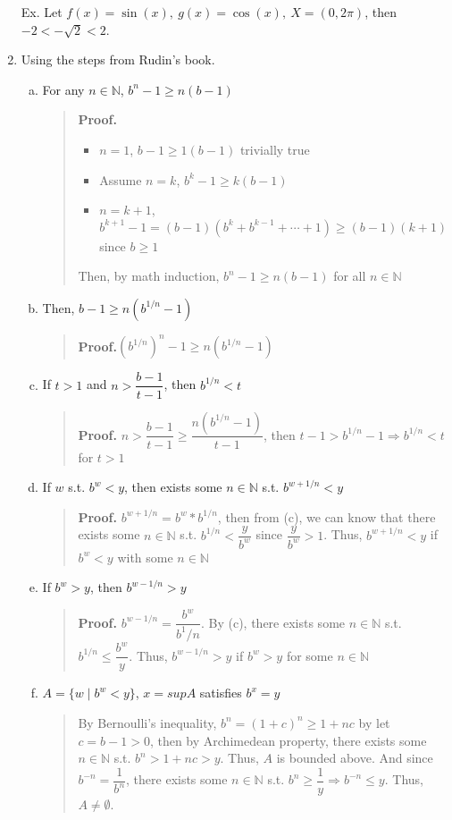 \documentclass[12pt]{article}
\begin{document}
\begin{enumerate}
    Ex. Let $f(x) = \sin(x),\ g(x) = \cos(x),\ X = (0, 2\pi)$, then $-2 < -\sqrt{2} < 2$.

    \newpage

    \item Using the steps from Rudin's book.
    \begin{enumerate}[(a)]
        \item For any $n \in \mathbb{N}$, $b^n -1 \geq n(b-1)$
            \begin{quote}
            {\bf Proof.}\begin{itemize}
                \item $n = 1$, $b -1 \geq 1(b-1)$ trivially true
                \item Assume $n = k$, $b^k-1 \geq k(b-1)$
                \item $n = k+1$, $b^{k+1} -1 = (b-1)(b^k + b^{k-1} + \cdots + 1) \geq (b-1)(k+1)$ since $b \geq 1$
            \end{itemize}
            Then, by math induction, $b^n-1 \geq n(b-1)$ for all $n \in \mathbb{N}$
        \end{quote}
        \item Then, $b-1 \geq n(b^{1/n} - 1)$\begin{quote}
            {\bf Proof.}$(b^{1/n})^n -1 \geq n(b^{1/n} -1)$
        \end{quote}
        \item If $t > 1$ and $n > \dfrac{b-1}{t-1}$, then $b^{1/n} < t$\begin{quote}
            {\bf Proof.} $n > \dfrac{b-1}{t-1} \geq \dfrac{n(b^{1/n} -1)}{t-1}$, then $t-1 > b^{1/n} -1 \Rightarrow b^{1/n} < t$ for $t > 1$
        \end{quote}
        \item If $w$ s.t. $b^w < y$, then exists some $n \in \mathbb{N}$ s.t. $b^{w + 1/n} < y$\begin{quote}
            {\bf Proof.} $b^{w + 1/n} = b^w *b^{1/n}$, then from (c), we can know that there exists some $n \in \mathbb{N}$ s.t. $b^{1/n} < \dfrac{y}{b^w}$ since $\dfrac{y}{b^w} > 1$. Thus, $b^{w + 1/n} < y$ if $b^w < y$ with some $n \in \mathbb{N}$
        \end{quote}
        \item If $b^w > y$, then $b^{w - 1/n} > y$\begin{quote}
            {\bf Proof.} $b^{w - 1/n} = \dfrac{b^w}{b^1/n}$. By (c), there exists some $n \in \mathbb{N}$ s.t. $b^{1/n} \leq \dfrac{b^w}{y}$. Thus, $b^{w-1/n} > y$ if $b^w > y$ for some $n \in \mathbb{N}$
        \end{quote}
        \item $A = \lbrace w \mid b^w < y\rbrace$, $x = sup A$ satisfies $b^x = y$\begin{quote}
            By Bernoulli's inequality, $b^n = (1 + c)^n \geq 1 + nc$ by let $c = b-1 > 0$, then by Archimedean property, there exists some $n \in \mathbb{N}$ s.t. $b^n > 1 + nc > y$. Thus, $A$ is bounded above.
            And since $b^{-n} = \dfrac{1}{b^n}$, there exists some $n \in \mathbb{N}$ s.t. $b^n \geq \dfrac{1}{y}\Rightarrow b^{-n} \leq y$. Thus, $A \neq \emptyset$.


\end{quote}
\end{enumerate}
\end{enumerate}
\end{document}
